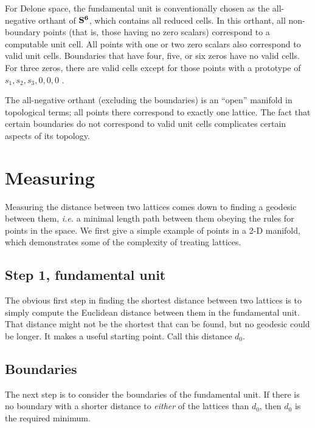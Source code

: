 \documentclass[preprint]{iucr}              %
\numberwithin{equation}{section}
\newcommand{\SVI}[0]{$\bf{S^{6}}$}
\begin{document}
	For Delone space, the fundamental unit is conventionally chosen
	as the all-negative orthant of \SVI{}, which contains all 
	reduced cells. In this orthant, all non-boundary 
	points (that is, those having no zero scalars) correspond to
	a computable unit cell. All points with one or two zero scalars also
	correspond to valid unit cells. Boundaries that have
	four, five, or six zeros have no valid cells. For three zeros, there are
	valid cells except for those points with a prototype of
	$s_1, s_2, s_3, 0, 0, 0$ \cite{Andrews2019b}.
	
	The all-negative orthant (excluding the boundaries) is 
	an ``open'' manifold in topological terms; all points
	there correspond to exactly one lattice. The fact that
	certain boundaries do not correspond to valid unit
	cells complicates certain aspects of its topology.
	
		
	
	\section{Measuring}

	
	Measuring the distance between two lattices
	comes down to finding a geodesic between them, {\it i.e.}
	a minimal length path between them obeying the rules for points
	in the space. We first give a simple example of points in
	a 2-D manifold, which demonstrates some of the complexity of treating lattices.
	
	\subsection{Step 1, fundamental unit}
	\label{fundamental}
	
	The obvious first step in finding the shortest distance between two
	lattices is to simply compute the Euclidean distance between
	them in the fundamental unit. That distance might not be the
	shortest that can be found, but no geodesic could 
	be longer. It makes a useful starting point. Call 
	this distance $d_0$.
	
	\subsection{Boundaries}
	
	The next step is to consider the boundaries of the fundamental
	unit. If there is no boundary with a shorter distance to
	 \textit{either} of	the lattices than $d_0$, then $d_0$ is the required minimum.  
	 
\end{document}
